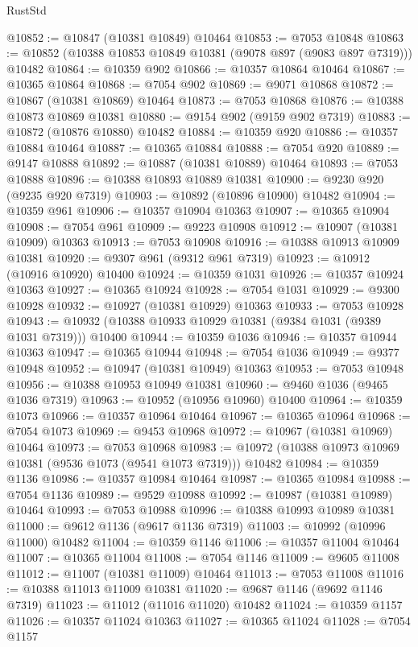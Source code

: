 \begin{lexlean}{RustStd}
\begin{coremodule}
@10852 := @10847 (@10381 @10849) @10464
@10853 := @7053 @10848
@10863 := @10852 (@10388 @10853 @10849 @10381 (@9078 @897 (@9083 @897 @7319))) @10482
@10864 := @10359 @902
@10866 := @10357 @10864 @10464
@10867 := @10365 @10864
@10868 := @7054 @902
@10869 := @9071 @10868
@10872 := @10867 (@10381 @10869) @10464
@10873 := @7053 @10868
@10876 := @10388 @10873 @10869 @10381
@10880 := @9154 @902 (@9159 @902 @7319)
@10883 := @10872 (@10876 @10880) @10482
@10884 := @10359 @920
@10886 := @10357 @10884 @10464
@10887 := @10365 @10884
@10888 := @7054 @920
@10889 := @9147 @10888
@10892 := @10887 (@10381 @10889) @10464
@10893 := @7053 @10888
@10896 := @10388 @10893 @10889 @10381
@10900 := @9230 @920 (@9235 @920 @7319)
@10903 := @10892 (@10896 @10900) @10482
@10904 := @10359 @961
@10906 := @10357 @10904 @10363
@10907 := @10365 @10904
@10908 := @7054 @961
@10909 := @9223 @10908
@10912 := @10907 (@10381 @10909) @10363
@10913 := @7053 @10908
@10916 := @10388 @10913 @10909 @10381
@10920 := @9307 @961 (@9312 @961 @7319)
@10923 := @10912 (@10916 @10920) @10400
@10924 := @10359 @1031
@10926 := @10357 @10924 @10363
@10927 := @10365 @10924
@10928 := @7054 @1031
@10929 := @9300 @10928
@10932 := @10927 (@10381 @10929) @10363
@10933 := @7053 @10928
@10943 := @10932 (@10388 @10933 @10929 @10381 (@9384 @1031 (@9389 @1031 @7319))) @10400
@10944 := @10359 @1036
@10946 := @10357 @10944 @10363
@10947 := @10365 @10944
@10948 := @7054 @1036
@10949 := @9377 @10948
@10952 := @10947 (@10381 @10949) @10363
@10953 := @7053 @10948
@10956 := @10388 @10953 @10949 @10381
@10960 := @9460 @1036 (@9465 @1036 @7319)
@10963 := @10952 (@10956 @10960) @10400
@10964 := @10359 @1073
@10966 := @10357 @10964 @10464
@10967 := @10365 @10964
@10968 := @7054 @1073
@10969 := @9453 @10968
@10972 := @10967 (@10381 @10969) @10464
@10973 := @7053 @10968
@10983 := @10972 (@10388 @10973 @10969 @10381 (@9536 @1073 (@9541 @1073 @7319))) @10482
@10984 := @10359 @1136
@10986 := @10357 @10984 @10464
@10987 := @10365 @10984
@10988 := @7054 @1136
@10989 := @9529 @10988
@10992 := @10987 (@10381 @10989) @10464
@10993 := @7053 @10988
@10996 := @10388 @10993 @10989 @10381
@11000 := @9612 @1136 (@9617 @1136 @7319)
@11003 := @10992 (@10996 @11000) @10482
@11004 := @10359 @1146
@11006 := @10357 @11004 @10464
@11007 := @10365 @11004
@11008 := @7054 @1146
@11009 := @9605 @11008
@11012 := @11007 (@10381 @11009) @10464
@11013 := @7053 @11008
@11016 := @10388 @11013 @11009 @10381
@11020 := @9687 @1146 (@9692 @1146 @7319)
@11023 := @11012 (@11016 @11020) @10482
@11024 := @10359 @1157
@11026 := @10357 @11024 @10363
@11027 := @10365 @11024
@11028 := @7054 @1157

\end{coremodule}
\end{lexlean}
